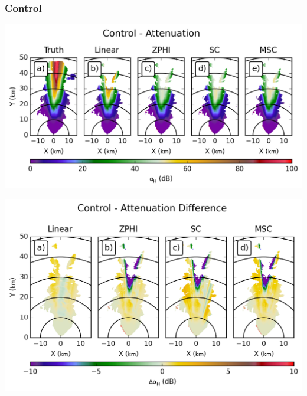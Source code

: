 \documentclass[red]{beamer}
\begin{document}
\subsubsection{Control}
\begin{frame}
    \begin{center}
        \includegraphics[scale=0.7]{figures/X_Control_Attenuation_H}
    \end{center}
\end{frame}

\begin{frame}
    \begin{center}
        \includegraphics[scale=0.7]{figures/X_Control_Attenuation_Difference_H}
    \end{center}
\end{frame}
\end{document}
